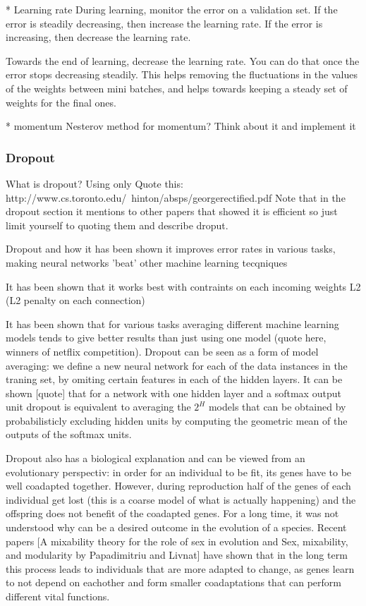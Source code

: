 \documentclass[11pt, fleqn, twoside]{article}
\begin{document}
  * Learning rate
      During learning, monitor the error on a validation set.
      If the error is steadily decreasing, then increase the learning rate.
      If the error is increasing, then decrease the learning rate.

      Towards the end of learning, decrease the learning rate. You can do that once the
      error stops decreasing steadily. This helps removing the fluctuations in the values of the weights between mini batches, and helps towards keeping a steady set of weights for the final ones.

  * momentum
    Nesterov method for momentum? Think about it and implement it


\subsubsection{Dropout}

  What is dropout? Using only
  Quote this:
  http://www.cs.toronto.edu/~hinton/absps/georgerectified.pdf
  Note that in the dropout section it mentions to other papers that showed it is efficient so
  just limit yourself to quoting them and describe droput.

  Dropout and how it has been shown it improves error rates in  various tasks, making neural networks 'beat' other machine learning tecqniques \cite{Srivastava2013}

  It has been shown that it works best with contraints on each incoming weights L2 (L2 penalty on each connection)

  It has been shown that for various tasks averaging different machine learning models tends to give better results than just using one model (quote here, winners of netflix competition). Dropout can be seen as a form of model averaging:
  we define a new neural network for each of the data instances in the traning set, by omiting certain features in each of the hidden layers.
  It can be shown [quote] that for a network with one hidden layer and a softmax output unit dropout is equivalent to averaging the $2^H$ models that can be obtained by probabilisticly excluding hidden units by computing the geometric mean of the outputs of the softmax units.

  Dropout also has a biological explanation and can be viewed from an evolutionary perspectiv: in order for an individual to be fit, its genes have to be well coadapted together. However, during reproduction half of the genes of each individual get lost (this is a coarse model of what is actually happening) and the offspring does not benefit of the coadapted genes. For a long time, it was not understood why can be a desired outcome in the evolution of a species. Recent papers [A mixability theory for the role of sex in evolution
  and Sex, mixability, and modularity by Papadimitriu and Livnat] have shown that in the long term this process leads to individuals that are more adapted to change, as genes learn to not depend on eachother and form smaller coadaptations that can perform different vital functions.
\end{document}
